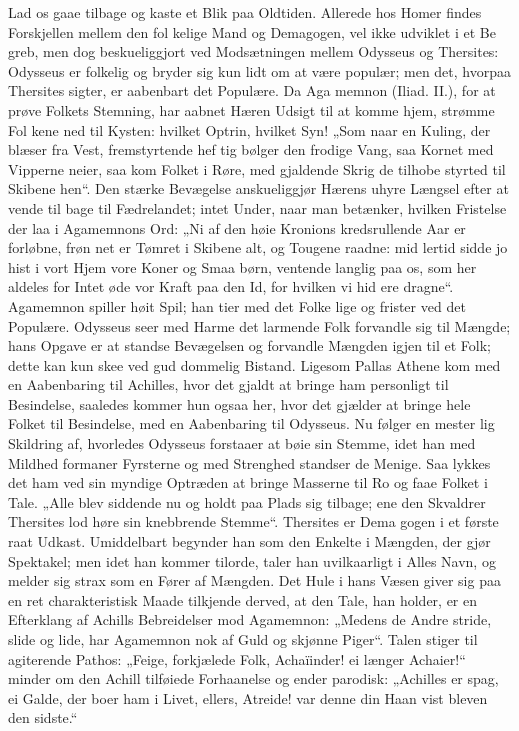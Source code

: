 \documentclass[12pt]{book}
\newcommand{\opage}[1]{\marginnote{\footnotesize\textit{[#1]}}}
\begin{document}
Lad os gaae tilbage og kaste et Blik paa Oldtiden.
Allerede hos Homer findes Forskjellen mellem den fol\-%
kelige Mand og Demagogen, vel ikke udviklet i et Be\-%
greb, men dog beskueliggjort ved Modsætningen mellem
Odysseus og Thersites: Odysseus er folkelig og bryder
sig kun lidt om at være populær; men det, hvorpaa
Thersites sigter, er aabenbart det Populære. Da Aga\-%
memnon (Iliad. II.), for at prøve Folkets Stemning, har
\opage{130}\setcounter{footnote}{0}%
aabnet Hæren Udsigt til at komme hjem, strømme Fol\-%
kene ned til Kysten: hvilket Optrin, hvilket Syn! „Som
naar en Kuling, der blæser fra Vest, fremstyrtende hef\-%
tig bølger den frodige Vang, saa Kornet med Vipperne
neier, saa kom Folket i Røre, med gjaldende Skrig de
tilhobe styrted til Skibene hen“. Den stærke Bevægelse
anskueliggjør Hærens uhyre Længsel efter at vende til\-%
bage til Fædrelandet; intet Under, naar man betænker,
hvilken Fristelse der laa i Agamemnons Ord: „Ni af
den høie Kronions kredsrullende Aar er forløbne, frøn\-%
net er Tømret i Skibene alt, og Tougene raadne: mid\-%
lertid sidde jo hist i vort Hjem vore Koner og Smaa\-%
børn, ventende langlig paa os, som her aldeles for Intet
øde vor Kraft paa den Id, for hvilken vi hid ere dragne“.
Agamemnon spiller høit Spil; han tier med det Folke\-%
lige og frister ved det Populære. Odysseus seer med
Harme det larmende Folk forvandle sig til Mængde;
hans Opgave er at standse Bevægelsen og forvandle
Mængden igjen til et Folk; dette kan kun skee ved gud\-%
dommelig Bistand. Ligesom Pallas Athene kom med
en Aabenbaring til Achilles, hvor det gjaldt at bringe
ham personligt til Besindelse, saaledes kommer hun ogsaa
her, hvor det gjælder at bringe hele Folket til Besindelse,
med en Aabenbaring til Odysseus. Nu følger en mester\-%
lig Skildring af, hvorledes Odysseus forstaaer at bøie
sin Stemme, idet han med Mildhed formaner Fyrsterne
og med Strenghed standser de Menige. Saa lykkes det
ham ved sin myndige Optræden at bringe Masserne til
Ro og faae Folket i Tale. „Alle blev siddende nu og
holdt paa Plads sig tilbage; ene den Skvaldrer Thersites
lod høre sin knebbrende Stemme“. Thersites er Dema\-%
gogen i et første raat Udkast. Umiddelbart begynder
han som den Enkelte i Mængden, der gjør Spektakel;
men idet han kommer tilorde, taler han uvilkaarligt i
\opage{131}\setcounter{footnote}{0}%
Alles Navn, og melder sig strax som en Fører af
Mængden. Det Hule i hans Væsen giver sig paa en ret
charakteristisk Maade tilkjende derved, at den Tale, han
holder, er en Efterklang af Achills Bebreidelser mod
Agamemnon: „Medens de Andre stride, slide og lide,
har Agamemnon nok af Guld og skjønne Piger“. Talen
stiger til agiterende Pathos: „Feige, forkjælede Folk,
Achaïinder! ei længer Achaier!“ minder om den Achill
tilføiede Forhaanelse og ender parodisk: „Achilles er
spag, ei Galde, der boer ham i Livet, ellers, Atreide!
var denne din Haan vist bleven den sidste.“
\end{document}

